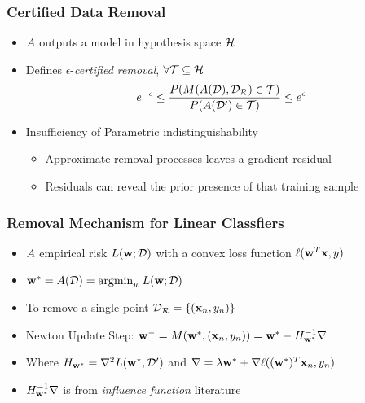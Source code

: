 \documentclass[pdf]{beamer}
\begin{document}
\begin{frame}
  \frametitle{Certified Data Removal \cite{guoCertifiedDataRemoval2020}}
  \begin{itemize}
    \item $A$ outputs a model in hypothesis space $\mathcal{H}$
    \item Defines $\epsilon$-\textit{certified removal}, $\forall \mathcal{T} \subseteq \mathcal{H}$
    \[
      e^{-\epsilon} \le \frac{P(M(A(\mathcal{D}),\mathcal{D_{R}})\in \mathcal{T})}{P(A(\mathcal{D}^{\prime})\in \mathcal{T})} \le e^{\epsilon}
    \]
    \item Insufficiency of Parametric indistinguishability
    \begin{itemize}
      \item Approximate removal processes leaves a gradient residual 
      \item Residuals can reveal the prior presence of that training sample
    \end{itemize}
  \end{itemize}
\end{frame}

\begin{frame}
  \frametitle{Removal Mechanism for Linear Classfiers}
  \begin{itemize}
    \item $A$ empirical risk $L(\textbf{w};\mathcal{D})$ with a convex loss function $\ell(\textbf{w}^{T}\textbf{x},y)$
    \item $\textbf{w}^{*} = A(\mathcal{D})=\operatorname*{\arg\!\min}_{w}L(\textbf{w};\mathcal{D})$
    \item To remove a single point $\mathcal{D_{R}} = \{(\textbf{x}_{n},y_{n})\}$ 
    \item Newton Update Step: $\textbf{w}^{-}=M(\textbf{w}^{*},(\textbf{x}_{n},y_{n})) = \textbf{w}^{*} - H^{-1}_{\textbf{w}^{*}}\nabla$
    \item Where $H_{\textbf{w}^{*}} = \nabla^{2}L(\textbf{w}^{*},\mathcal{D}^{\prime})$ and $\nabla = \lambda\textbf{w}^{*} + \nabla\ell((\textbf{w}^{*})^{T}\textbf{x}_{n},y_{n})$
    \item $H ^{-1}_{\textbf{w}^{*}}\nabla$ is from \textit{influence function} literature 
  \end{itemize}

\end{frame}
\end{document}
